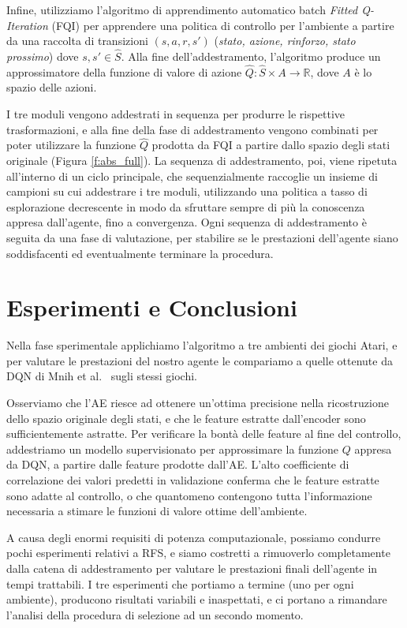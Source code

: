 Infine, utilizziamo l'algoritmo di apprendimento automatico batch 
\textit{Fitted Q-Iteration} (FQI) \cite{ernst2005tree} per apprendere una 
politica  di controllo per l'ambiente a partire da una raccolta di transizioni 
$(s, a, r, s')$ (\textit{stato, azione, rinforzo, stato prossimo}) dove 
$s, s' \in \hat{S}$. Alla fine dell'addestramento, l'algoritmo produce un 
approssimatore della funzione di valore di azione $\hat{Q}: \hat{S} \times A \rightarrow \mathbb{R}$, 
dove $A$ \`e lo spazio delle azioni. 

I tre moduli vengono addestrati in sequenza per produrre le rispettive 
trasformazioni, e alla fine della fase di addestramento vengono combinati 
per poter utilizzare la funzione $\hat{Q}$ prodotta da FQI a partire dallo
spazio degli stati originale (Figura \ref{f:abs_full}).
La sequenza di addestramento, poi, viene ripetuta all'interno
di un ciclo principale, che sequenzialmente raccoglie un insieme di campioni
su cui addestrare i tre moduli, utilizzando una politica a tasso di esplorazione
decrescente in modo da sfruttare sempre di pi\`u la conoscenza appresa 
dall'agente, fino a convergenza. Ogni sequenza di addestramento \`e seguita
da una fase di valutazione, per stabilire se le prestazioni dell'agente siano
soddisfacenti ed eventualmente terminare la procedura. 

\section*{Esperimenti e Conclusioni}
Nella fase sperimentale applichiamo l'algoritmo a tre ambienti dei giochi Atari,
e per valutare le prestazioni del nostro agente le compariamo a quelle ottenute
da DQN di Mnih et al.\ \cite{mnih2015human} sugli stessi giochi.

Osserviamo che l'AE riesce ad ottenere un'ottima precisione nella ricostruzione 
dello spazio originale degli stati, e che le feature estratte dall'encoder 
sono sufficientemente astratte.
Per verificare la bont\`a delle feature al fine del controllo, addestriamo un 
modello supervisionato per approssimare la funzione $Q$ appresa da DQN, a 
partire dalle feature prodotte dall'AE. 
L'alto coefficiente di correlazione dei valori predetti in validazione conferma 
che le feature estratte sono adatte al controllo, o che quantomeno contengono 
tutta l'informazione necessaria a stimare le funzioni di valore ottime 
dell'ambiente. 

A causa degli enormi requisiti di potenza computazionale, possiamo 
condurre pochi esperimenti relativi a RFS, e siamo costretti a rimuoverlo 
completamente dalla catena di addestramento per valutare le prestazioni
finali dell'agente in tempi trattabili. 
I tre esperimenti che portiamo a termine (uno per ogni ambiente), producono 
risultati variabili e inaspettati, e ci portano a rimandare l'analisi della
procedura di selezione ad un secondo momento. 

